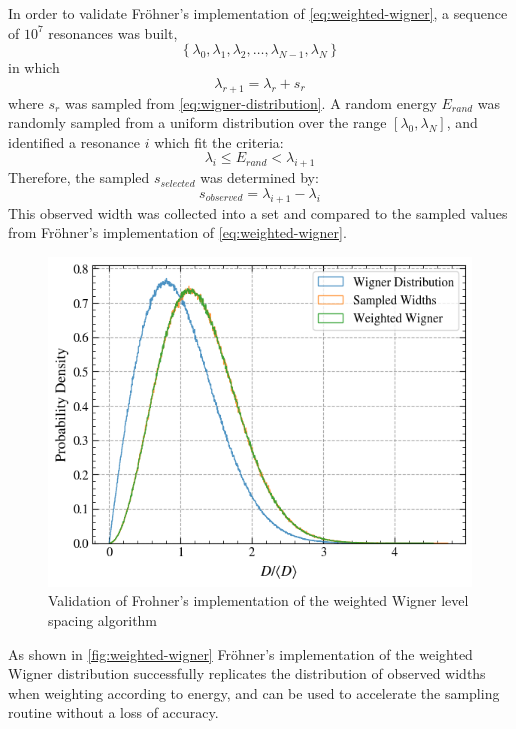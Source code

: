 In order to validate Fr\"{o}hner's implementation of \autoref{eq:weighted-wigner}, a sequence of $10^7$ resonances was built,
\begin{equation}
    \left\{\lambda_0, \lambda_1, \lambda_2, \dots, \lambda_{N-1}, \lambda_{N} \right\}
\end{equation}
in which
\begin{equation}
    \lambda_{r+1} = \lambda_r + s_r
\end{equation}
where $s_r$ was sampled from \autoref{eq:wigner-distribution}. A random energy $E_{rand}$ was randomly sampled from a uniform distribution over the range $[\lambda_0,\lambda_N]$, and identified a resonance $i$ which fit the criteria:
\begin{equation}
    \lambda_i \leq E_{rand} < \lambda_{i+1}
\end{equation}
Therefore, the sampled $s_{selected}$ was determined by:
\begin{equation}
    s_{observed} = \lambda_{i+1} - \lambda_{i}
\end{equation}
This observed width was collected into a set and compared to the sampled values from Fr\"{o}hner's implementation of \autoref{eq:weighted-wigner}.
\begin{figure}[H]
    \centering
    \includegraphics[width=0.75\linewidth]{Implementation/Figures/weighted-wigner-validation.png}
    \caption{Validation of Frohner's implementation of the weighted Wigner level spacing algorithm}
    \label{fig:weighted-wigner}
\end{figure}

As shown in \autoref{fig:weighted-wigner} Fr\"{o}hner's implementation of the weighted Wigner distribution successfully replicates the distribution of observed widths when weighting according to energy, and can be used to accelerate the sampling routine without a loss of accuracy.

